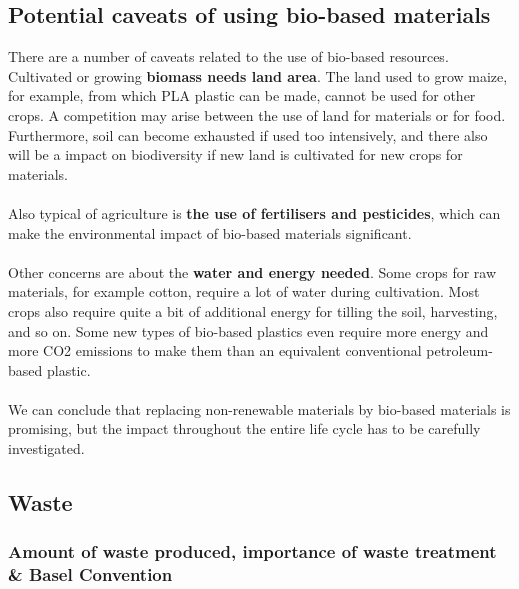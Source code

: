 \documentclass[../summary.tex]{subfiles}
\begin{document}
	\subsection{Potential caveats of using bio-based materials}
	
	There are a number of caveats related to the use of bio-based resources. Cultivated or growing \textbf{biomass needs land area}. The land used to grow maize, for example, from which PLA plastic can be made, cannot be used for other crops. A competition may arise between the use of land for materials or for food. Furthermore, soil can become exhausted if used too intensively, and there also will be a impact on biodiversity if new land is cultivated for new crops for materials. 
	\\\\
	Also typical of agriculture is \textbf{the use of fertilisers and pesticides}, which can make the environmental impact of bio-based materials significant.
	\\\\
	Other concerns are about the \textbf{water and energy needed}. Some crops for raw materials, for example cotton, require a lot of water during cultivation. Most crops also require quite a bit of additional energy for tilling the soil, harvesting, and so on. Some new types of bio-based plastics even require more energy and more CO2 emissions to make them than an equivalent conventional petroleum-based plastic. 
	\\\\
	We can conclude that replacing non-renewable materials by bio-based materials is promising, but the impact throughout the entire life cycle has to be carefully investigated.
	
	\subsection{Waste}
	\subsubsection{Amount of waste produced, importance of waste treatment \& Basel Convention}
	
\end{document}
